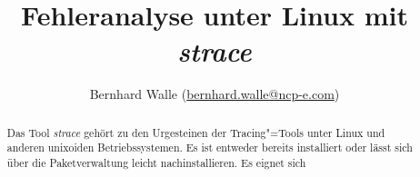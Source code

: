 \documentclass[10pt,DIV=14,twocolumn,ngerman,parskip=half]{scrartcl}
\begin{document}
\title{Fehleranalyse unter Linux mit \emph{strace}}

\author{Bernhard Walle (\url{bernhard.walle@ncp-e.com})}

\maketitle

\begin{abstract}
    Das Tool \emph{strace} gehört zu den Urgesteinen der Tracing"=Tools unter Linux und anderen
    unixoiden Betriebssystemen. Es ist entweder bereits installiert oder lässt sich über die
    Paketverwaltung leicht nachinstallieren. Es eignet sich 
\end{abstract}



    
\end{document}
